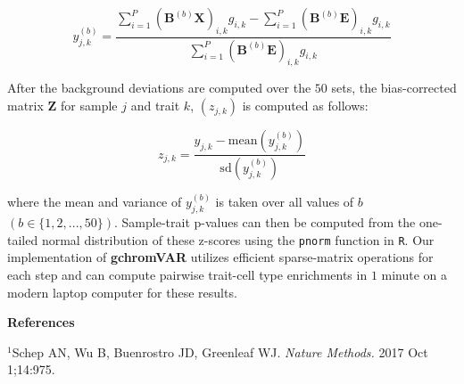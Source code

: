 \documentclass{article}\usepackage[]{graphicx}\usepackage[]{color}
\begin{document}
$$ y_{j,k}^{(b)} = \frac{\sum_{i=1}^P (\boldsymbol{B}^{(b)}\boldsymbol{X})_{i,k}g_{i,k} -\sum_{i=1}^P (\boldsymbol{B}^{(b)}\boldsymbol{E})_{i,k}g_{i,k}}{\sum_{i=1}^P (\boldsymbol{B}^{(b)}\boldsymbol{E})_{i,k}g_{i,k}} $$

\noindent After the background deviations are computed over the $50$ sets, the bias-corrected matrix $\boldsymbol{Z}$ for sample $j$ and trait $k$, $(z_{j,k})$ is computed as follows:

$$ z_{j,k} = \frac{y_{j,k} - \mathrm{mean}(y_{j,k}^{(b)})}{\mathrm{sd}(y_{j,k}^{(b)})} $$

\noindent where the mean and variance of $y_{j,k}^{(b)}$ is taken over all values of $b$ $(b \in \{1,2,...,50\})$. Sample-trait p-values can then be computed from the one-tailed normal distribution of these z-scores using the \texttt{pnorm} function in \texttt{R}. Our implementation of \textbf{gchromVAR} utilizes efficient sparse-matrix operations for each step and can compute pairwise trait-cell type enrichments in $1$ minute on a modern laptop computer for these results. \newline\newline\newline

\noindent \textbf{References} 

\noindent $^1$Schep AN, Wu B, Buenrostro JD, Greenleaf WJ. \textit{Nature Methods.} 2017 Oct 1;14:975. \newline
\end{document}
